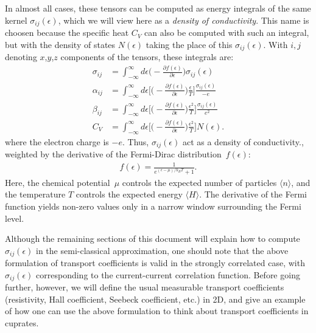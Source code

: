 \documentclass[notitlepage,11pt,nofootinbib]{revtex4-1}
\begin{document}
In almost all cases, these tensors can be computed as energy integrals of the same kernel $\sigma_{ij}(\epsilon)$, which we will view here as a \emph{density of conductivity}. This name is choosen because the specific heat $C_V$ can also be computed with such an integral, but with the density of states $N(\epsilon)$ taking the place of this $\sigma_{ij}(\epsilon)$. With $i,j$ denoting $x$,$y$,$z$ components of the tensors, these integrals are:
\begin{align}
\sigma_{ij}
&=
\int_{-\infty}^{\infty} d\epsilon
\Big(-\frac{\partial f(\epsilon)}{\partial \epsilon}\Big)\sigma_{ij}(\epsilon)
\label{sigma}
\\
\alpha_{ij}
&=
\int_{-\infty}^{\infty}d\epsilon
\bigg[\Big(-\frac{\partial f(\epsilon)}{\partial \epsilon}\Big)\frac{\epsilon}{T}\bigg]\frac{\sigma_{ij}(\epsilon)}{-e}
\label{alpha}
\\
\beta_{ij}
&=
\int_{-\infty}^{\infty}d\epsilon
\bigg[\Big(-\frac{\partial f(\epsilon)}{\partial \epsilon}\Big)\frac{\epsilon^2}{T}\bigg]\frac{\sigma_{ij}(\epsilon)}{e^2}
\label{beta}
\\
C_V
&=
\int_{-\infty}^{\infty}d\epsilon
\bigg[\Big(-\frac{\partial f(\epsilon)}{\partial \epsilon}\Big)\frac{\epsilon^2}{T}\bigg]N(\epsilon).
\end{align}
where the electron charge is $-e$. Thus, $\sigma_{ij}(\epsilon)$ act as a density of conductivity., weighted by the derivative of the Fermi-Dirac distribution~$f(\epsilon)$:
\begin{align}
f(\epsilon) = \frac{1}{e^{(\epsilon-\mu)/k_{B}T}+1}.
\end{align}
Here, the chemical potential~$\mu$ controls the expected number of particles $\langle n\rangle$, and the temperature $T$ controls the expected energy $\langle H\rangle$. The derivative of the Fermi function yields non-zero values only in a narrow window surrounding the Fermi level.

Although the remaining sections of this document will explain how to compute $\sigma_{ij}(\epsilon)$ in the semi-classical approximation,
one should note that the above formulation of transport coefficients is valid in the strongly correlated case, with $\sigma_{ij}(\epsilon)$ corresponding to the current-current correlation function.
Before going further, however, we will define the usual measurable transport coefficients (resistivity, Hall coefficient, Seebeck coefficient, etc.) in 2D, and give an example of how one can use the above formulation to think about transport coefficients in cuprates.
\end{document}
